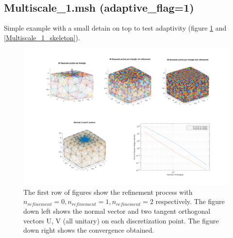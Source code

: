 \documentclass[11pt, oneside]{article}   	%
\begin{document}
\newpage
\subsection{Multiscale\_1.msh (adaptive\_flag=1)}
Simple example with a small detain on top to test adaptivity (figure \ref{Multiscale_1} and \ref{Multiscale_1_skeleton}).

\begin{figure}[H]
\begin{center}
\includegraphics[width=6in]{Multiscale_1.pdf}
\end{center}
\caption{The first row of figures show the refinement process with $n_{refinement}=0, n_{refinement}=1, n_{refinement}=2$ respectively. The figure down left shows the normal vector and two tangent orthogonal vectors U, V (all unitary) on each discretization point. The figure down right shows the convergence obtained.}
\label{Multiscale_1}
\end{figure}
\end{document}
